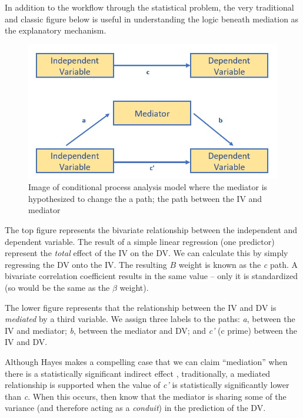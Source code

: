 \documentclass[
  11pt,
]{book}
\begin{document}
In addition to the workflow through the statistical problem, the very traditional and classic figure below is useful in understanding the logic beneath mediation as the explanatory mechanism.

\begin{figure}
\centering
\includegraphics{images/SimpleMed/MedRationale.jpg}
\caption{Image of conditional process analysis model where the mediator is hypothesized to change the a path; the path between the IV and mediator}
\end{figure}

The top figure represents the bivariate relationship between the independent and dependent variable. The result of a simple linear regression (one predictor) represent the \emph{total} effect of the IV on the DV. We can calculate this by simply regressing the DV onto the IV. The resulting \(B\) weight is known as the \emph{c} path. A bivariate correlation coefficient results in the same value -- only it is standardized (so would be the same as the \(\beta\) weight).

The lower figure represents that the relationship between the IV and DV is \emph{mediated} by a third variable. We assign three labels to the paths: \emph{a}, between the IV and mediator; \emph{b}, between the mediator and DV; and \emph{c'} (c prime) between the IV and DV.

Although Hayes makes a compelling case that we can claim ``mediation'' when there is a statistically significant indirect effect \citeyearpar{hayes_introduction_2018}, traditionally, a mediated relationship is supported when the value of \emph{c'} is statistically significantly lower than \emph{c}. When this occurs, then know that the mediator is sharing some of the variance (and therefore acting as a \emph{conduit}) in the prediction of the DV.
\end{document}
